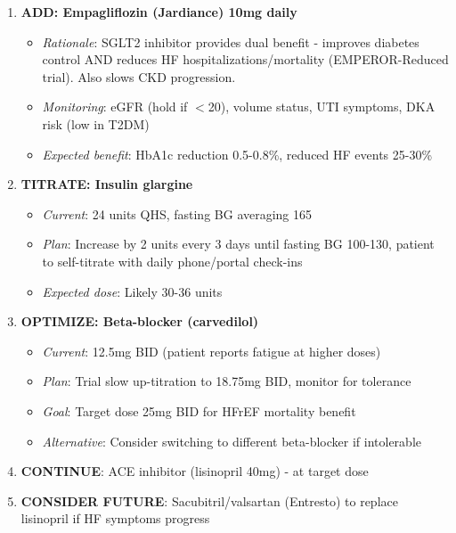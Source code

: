 \documentclass[11pt,letterpaper]{article}
\begin{document}
\begin{enumerate}[leftmargin=*]
    \item \textbf{ADD: Empagliflozin (Jardiance) 10mg daily}
    \begin{itemize}
        \item \textit{Rationale}: SGLT2 inhibitor provides dual benefit - improves diabetes control AND reduces HF hospitalizations/mortality (EMPEROR-Reduced trial). Also slows CKD progression.
        \item \textit{Monitoring}: eGFR (hold if $<$20), volume status, UTI symptoms, DKA risk (low in T2DM)
        \item \textit{Expected benefit}: HbA1c reduction 0.5-0.8\%, reduced HF events 25-30\%
    \end{itemize}
    
    \item \textbf{TITRATE: Insulin glargine}
    \begin{itemize}
        \item \textit{Current}: 24 units QHS, fasting BG averaging 165
        \item \textit{Plan}: Increase by 2 units every 3 days until fasting BG 100-130, patient to self-titrate with daily phone/portal check-ins
        \item \textit{Expected dose}: Likely 30-36 units
    \end{itemize}
    
    \item \textbf{OPTIMIZE: Beta-blocker (carvedilol)}
    \begin{itemize}
        \item \textit{Current}: 12.5mg BID (patient reports fatigue at higher doses)
        \item \textit{Plan}: Trial slow up-titration to 18.75mg BID, monitor for tolerance
        \item \textit{Goal}: Target dose 25mg BID for HFrEF mortality benefit
        \item \textit{Alternative}: Consider switching to different beta-blocker if intolerable
    \end{itemize}
    
    \item \textbf{CONTINUE}: ACE inhibitor (lisinopril 40mg) - at target dose
    
    \item \textbf{CONSIDER FUTURE}: Sacubitril/valsartan (Entresto) to replace lisinopril if HF symptoms progress
\end{enumerate}
\end{document}
